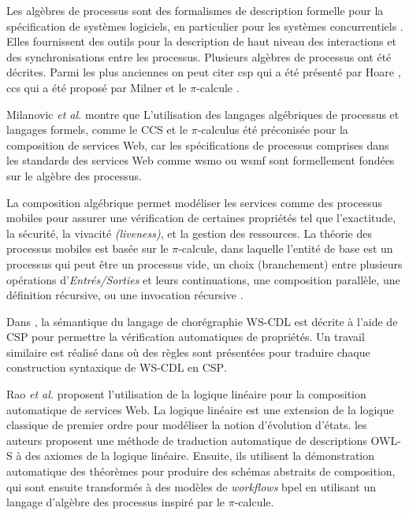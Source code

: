   Les algèbres de processus sont des formalismes de description
  formelle pour la spécification de systèmes logiciels, en particulier
  pour les systèmes concurrentiels \cite{dumez2010approche}. Elles
  fournissent des outils pour la description de haut niveau des
  interactions et des synchronisations entre les processus. Plusieurs
  algèbres de processus ont été décrites. Parmi les plus anciennes on
  peut citer \acrshort{csp} qui a été présenté par Hoare
  \cite{hoare1978communicating}, \acrshort{ccs} qui a été proposé par
  Milner \cite{milner1982finite, milner1989communication} et le
  $\pi$-calcule \cite{milner1992calculus}.\medskip

  Milanovic \textit{et al.} \cite{milanovic2004current} montre que
  L'utilisation des langages algébriques de processus et langages
  formels, comme le \textsc{CCS} et le $\pi$-calculus été préconisée
  pour la composition de services Web, car les spécifications de
  processus comprises dans les standards des services Web comme
  \acrshort{wsmo} ou \acrshort{wsmf} sont formellement fondées sur le
  algèbre des processus.\medskip

  La composition algébrique permet modéliser les services comme des
  processus mobiles pour assurer une vérification de certaines
  propriétés tel que l'exactitude, la sécurité, la vivacité
  \textit{(liveness)}, et la gestion des ressources. La théorie des
  processus mobiles est basée sur le $\pi$-calcule, dans laquelle
  l'entité de base est un processus qui peut être un processus vide,
  un choix (branchement) entre plusieurs opérations
  d'\textit{Entrés/Sorties} et leurs continuations, une composition
  parallèle, une définition récursive, ou une invocation récursive
  \cite{zahirathesis2008}.\medskip

  Dans \cite{koshkina2004modelling}, la sémantique du langage de
  chorégraphie \textsc{WS-CDL} est décrite à l'aide de \textsc{CSP}
  pour permettre la vérification automatiques de propriétés. Un
  travail similaire est réalisé dans \cite{li2007modeling} où des
  règles sont présentées pour traduire chaque construction syntaxique
  de \textsc{WS-CDL} en \textsc{CSP}.\medskip

  Rao \textit{et al.} \cite{rao2004logic} proposent l'utilisation de
  la logique linéaire pour la composition automatique de services
  Web. La logique linéaire est une extension de la logique classique
  de premier ordre pour modéliser la notion d'évolution d'états. les
  auteurs proposent une méthode de traduction automatique de
  descriptions \textsc{OWL-S} à des axiomes de la logique
  linéaire. Ensuite, ils utilisent la démonstration automatique des
  théorèmes pour produire des schémas abstraits de composition, qui
  sont ensuite transformés à des modèles de \textit{workflows}
  \acrshort{bpel} en utilisant un langage d'algèbre des processus
  inspiré par le $\pi$-calcule.\medskip


